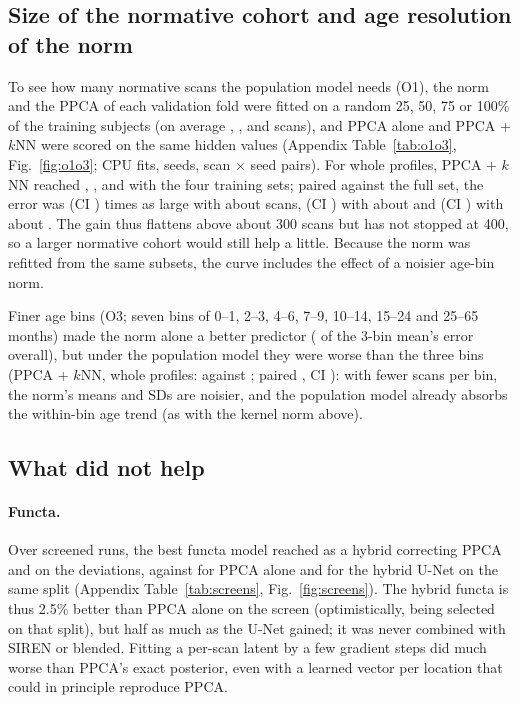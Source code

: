 \documentclass[11pt]{article}
\begin{document}
\subsection{Size of the normative cohort and age resolution of the norm}\label{sec:o1o3}

To see how many normative scans the population model needs (O1), the norm and the PPCA of each validation fold were fitted
on a random 25, 50, 75 or 100\% of the training subjects (on average \oNQ, \oNH, \oNT{} and \oNA{} scans), and PPCA alone
and PPCA + $k$NN were scored on the same hidden values (Appendix Table~\ref{tab:o1o3}, Fig.~\ref{fig:o1o3}; CPU fits,
\oOneSeeds{} seeds, \oOneScans{} scan $\times$ seed pairs). For whole profiles, PPCA + $k$NN reached \oQKnnWhole,
\oHKnnWhole, \oTKnnWhole{} and \oAKnnWhole{} with the four training sets; paired against the full set, the error was
\oPairQKnn{} (CI \oPairQKnnCi) times as large with about \oNQ{} scans, \oPairHKnn{} (CI \oPairHKnnCi) with about \oNH{} and
\oPairTKnn{} (CI \oPairTKnnCi) with about \oNT. The gain thus flattens above about 300 scans but has not stopped at 400,
so a larger normative cohort would still help a little. Because the norm was refitted from the same subsets, the curve
includes the effect of a noisier age-bin norm.

Finer age bins (O3; seven bins of 0--1, 2--3, 4--6, 7--9, 10--14, 15--24 and 25--65 months) made the norm alone a better
predictor (\oFNorm{} of the 3-bin mean's error overall), but under the population model they were worse than the three
bins (PPCA + $k$NN, whole profiles: \oFKnnWhole{} against \oAKnnWhole; paired \oPairFKnn, CI \oPairFKnnCi): with fewer scans
per bin, the norm's means and SDs are noisier, and the population model already absorbs the within-bin age trend (as with
the kernel norm above).

\subsection{What did not help}\label{sec:negative}

\paragraph{Functa.} Over \nFunctaConfigs{} screened runs, the best functa model reached \sFunctaHyb{} as a hybrid
correcting PPCA and \sFunctaDev{} on the deviations, against \sPpca{} for PPCA alone and \sUnet{} for the hybrid U-Net on
the same split (Appendix Table~\ref{tab:screens}, Fig.~\ref{fig:screens}). The hybrid functa is thus 2.5\% better than PPCA alone
on the screen (optimistically, being selected on that split), but half as much as the U-Net gained; it was never
combined with SIREN or blended. Fitting a per-scan latent by a few gradient steps did much worse than PPCA's exact
posterior, even with a learned vector per location that could in principle reproduce PPCA.
\end{document}
